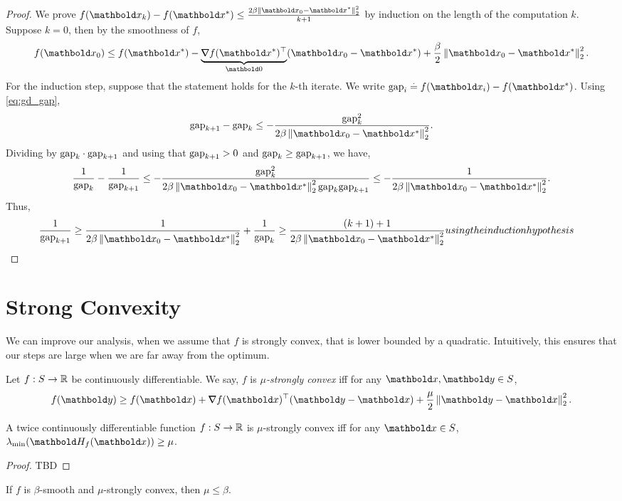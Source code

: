 \begin{proof} We prove $f(\vx_k) - f(\s{\vx}) \leq \frac{2\beta\norm{\vx_0 - \s{\vx}}_2^2}{k+1}$ by induction on the length of the computation $k$. Suppose $k = 0$, then by the smoothness of $f$, \begin{align*}
    f(\vx_0) \leq f(\s{\vx}) - \underbrace{\trans{\grad f(\s{\vx})}}_{\vZero}(\vx_0 - \s{\vx}) + \frac{\beta}{2}\norm{\vx_0 - \s{\vx}}_2^2.
\end{align*} For the induction step, suppose that the statement holds for the $k$-th iterate. We write $\dgap_i \defeq f(\vx_i) - f(\s{\vx})$. Using \cref{eq:gd_gap}, \begin{align*}
    \dgap_{k+1} - \dgap_k \leq -\frac{\dgap_k^2}{2\beta\norm{\vx_0 - \s{\vx}}_2^2}.
\end{align*} Dividing by $\mathrm{gap}_k \cdot \mathrm{gap}_{k+1}$ and using that $\mathrm{gap}_{k+1} > 0$ and $\mathrm{gap}_k \geq \mathrm{gap}_{k+1}$, we have, \begin{align*}
    \frac{1}{\dgap_k} - \frac{1}{\dgap_{k+1}} \leq -\frac{\dgap_k^2}{2\beta\norm{\vx_0 - \s{\vx}}_2^2 \dgap_k \dgap_{k+1}} \leq -\frac{1}{2\beta\norm{\vx_0 - \s{\vx}}_2^2}.
\end{align*} Thus, \begin{align*}
    \frac{1}{\dgap_{k+1}} \geq \frac{1}{2\beta\norm{\vx_0 - \s{\vx}}_2^2} + \frac{1}{\dgap_k} \geq \frac{(k+1) + 1}{2\beta\norm{\vx_0 - \s{\vx}}_2^2} \margintag{using the induction hypothesis} &\qedhere
\end{align*}
\end{proof}

\section{Strong Convexity}

We can improve our analysis, when we assume that $f$ is strongly convex, that is lower bounded by a quadratic. Intuitively, this ensures that our steps are large when we are far away from the optimum.

\begin{defn} Let $f: S \to \mathbb{R}$ be continuously differentiable. We say, $f$ is \emph{$\mu$-strongly convex} iff for any $\vx,\vy \in \sS$, \begin{align}
    f(\vy) \geq f(\vx) + \trans{\grad f(\vx)}(\vy - \vx) + \frac{\mu}{2}\norm{\vy - \vx}_2^2.
\end{align}
\end{defn}
\begin{lem}
A twice continuously differentiable function $f: S \to \mathbb{R}$ is $\mu$-strongly convex iff for any $\vx \in \sS$, $\lambda_{\min}(\mH_f(\vx)) \geq \mu$.
\end{lem}
\begin{proof}
TBD
\end{proof}
\begin{cor}
If $f$ is $\beta$-smooth and $\mu$-strongly convex, then $\mu \leq \beta$.
\end{cor}

